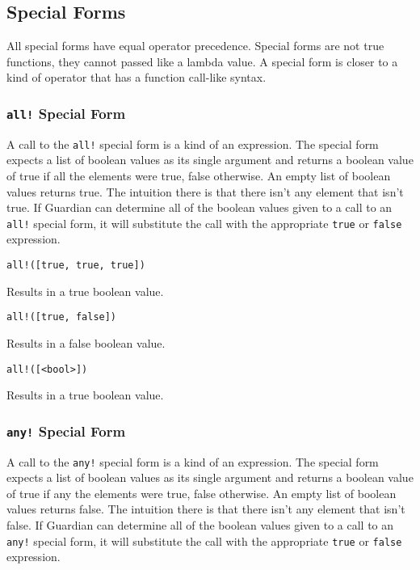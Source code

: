 
\subsection{Special Forms}
{
	All special forms have equal operator precedence.
	Special forms are not true functions, they cannot passed like a lambda
	value. A special form is closer to a kind of operator
	that has a function call-like
	syntax.
	
	\subsubsection{\texttt{all!} Special Form}
	{
		A call to the \texttt{all!} special form is a kind of an expression.
		The special form expects a list of boolean values as its
		single argument and returns a boolean value of true if all the elements
		were true, false otherwise. An empty list of boolean values returns true.
		The intuition there is that there isn't any element that isn't true.
		If Guardian can determine all of the boolean values given to a call to an
		\texttt{all!} special form, it will substitute the call with the
		appropriate \texttt{true} or \texttt{false} expression.
		
		\begin{itemize}
		{
			\item[] \texttt{all!([true, true, true])}
			
				Results in a true boolean value.
			
			\item[] \texttt{all!([true, false])}
			
				Results in a false boolean value.
			
			\item[] \texttt{all!([<bool>])}
			
				Results in a true boolean value.
		}
		\end{itemize}
	}
	
	\subsubsection{\texttt{any!} Special Form}
	{
		A call to the \texttt{any!} special form is a kind of an expression.
		The special form expects a list of boolean values as its
		single argument and returns a boolean value of true if any the elements
		were true, false otherwise. An empty list of boolean values returns false.
		The intuition there is that there isn't any element that isn't false.
		If Guardian can determine all of the boolean values given to a call to an
		\texttt{any!} special form, it will substitute the call with the
		appropriate \texttt{true} or \texttt{false} expression.
		
}}
